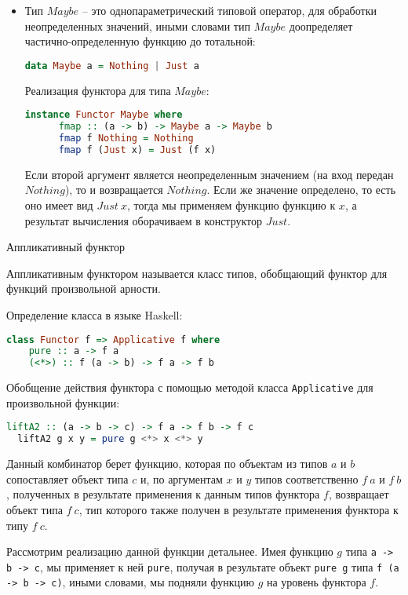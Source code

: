 \begin{itemize}
  \item Тип $Maybe$ -- это однопараметрический типовой оператор, для обработки неопределенных значений, иными словами тип $Maybe$ доопределяет
  частично-определенную функцию до тотальной:
  \begin{lstlisting}[language=Haskell]
    data Maybe a = Nothing | Just a
  \end{lstlisting}

  Реализация функтора для типа $Maybe$:
  \begin{lstlisting}[language=Haskell]
    instance Functor Maybe where
      fmap :: (a -> b) -> Maybe a -> Maybe b
      fmap f Nothing = Nothing
      fmap f (Just x) = Just (f x)
  \end{lstlisting}

  Если второй аргумент является неопределенным значением (на вход передан $Nothing$), то и возвращается $Nothing$. Если же значение определено, то есть оно имеет вид $Just \: x$, тогда
  мы применяем функцию функцию к $x$, а результат вычисления оборачиваем в конструктор $Just$.
\end{itemize}

\begin{defin} Аппликативный функтор

  Аппликативным функтором называется класс типов, обобщающий функтор для функций произвольной арности.
\end{defin}

Определение класса в языке Haskell:

\begin{lstlisting}[language=Haskell]
  class Functor f => Applicative f where
    pure :: a -> f a
    (<*>) :: f (a -> b) -> f a -> f b
\end{lstlisting}

Обобщение действия функтора с помощью методой класса \verb"Applicative" для произвольной функции:
\begin{lstlisting}[language=Haskell]
  liftA2 :: (a -> b -> c) -> f a -> f b -> f c
  liftA2 g x y = pure g <*> x <*> y
\end{lstlisting}

Данный комбинатор берет функцию, которая по объектам из типов $a$ и $b$ сопоставляет объект типа $c$ и,
по аргументам $x$ и $y$ типов соответственно $f \: a$ и $f \: b$, полученных в результате применения к данным типов функтора $f$,
возвращает объект типа $f \: c$, тип которого также получен в результате применения функтора к типу $f \: c$.

Рассмотрим реализацию данной функции детальнее. Имея функцию $g$ типа \verb"a -> b -> c", мы
применяет к ней \verb"pure", получая в результате объект \verb"pure g" типа \verb"f (a -> b -> c)",
иными словами, мы подняли функцию $g$ на уровень функтора $f$.

